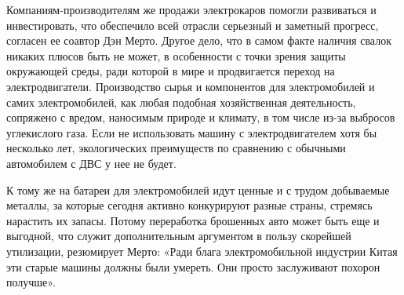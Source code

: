 Компаниям-производителям же продажи электрокаров помогли развиваться и инвестировать, что обеспечило всей отрасли серьезный и заметный прогресс, согласен ее соавтор Дэн Мерто. Другое дело, что в самом факте наличия свалок никаких плюсов быть не может, в особенности с точки зрения защиты окружающей среды, ради которой в мире и продвигается переход на электродвигатели. Производство сырья и компонентов для электромобилей и самих электромобилей, как любая подобная хозяйственная деятельность, сопряжено с вредом, наносимым природе и климату, в том числе из-за выбросов углекислого газа. Если не использовать машину с электродвигателем хотя бы несколько лет, экологических преимуществ по сравнению с обычными автомобилем с ДВС у нее не будет.

К тому же на батареи для электромобилей идут ценные и с трудом добываемые металлы, за которые сегодня активно конкурируют разные страны, стремясь нарастить их запасы. Потому переработка брошенных авто может быть еще и выгодной, что служит дополнительным аргументом в пользу скорейшей утилизации, резюмирует Мерто: «Ради блага электромобильной индустрии Китая эти старые машины должны были умереть. Они просто заслуживают похорон получше».